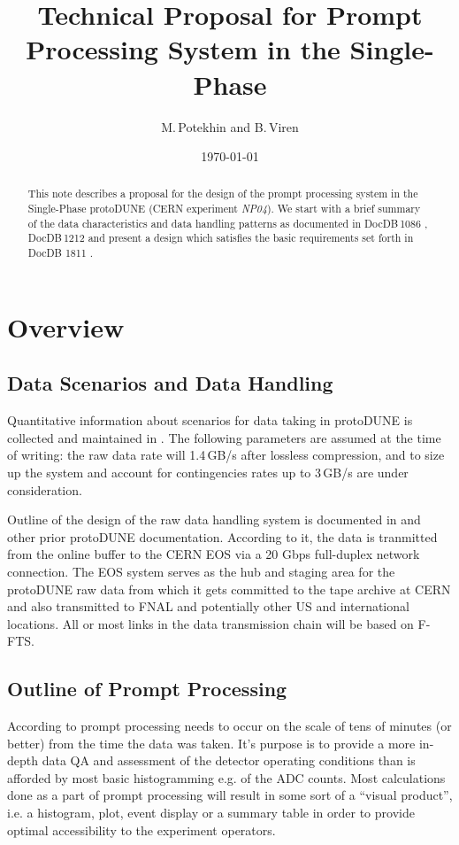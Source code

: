 \documentclass[pdftex,12pt,letter]{article}
\title{Technical Proposal for Prompt Processing System in the Single-Phase \pd}
\date{\today}
\author{M.\,Potekhin and B.\,Viren}
\newcommand{\pd}{protoDUNE\xspace}
\newcommand{\expname}{\textit{NP04}\xspace}
\begin{document}
\maketitle

\begin{abstract}
\noindent  This note describes a proposal for the design of
the prompt processing system in the Single-Phase \pd
(CERN experiment \expname). We start with a brief summary of the data characteristics and data handling patterns
as documented in DocDB\,1086 \cite{docdb1086}, DocDB\,1212 \cite{docdb1212} and present a design which
satisfies the basic requirements set forth in  DocDB 1811 \cite{docdb1811}.
\end{abstract}

\section{Overview}
\subsection{Data Scenarios and Data Handling}
\label{sec:rawdata}
Quantitative information about scenarios for data taking in \pd is collected and maintained in \cite{docdb1086}. The following parameters
are assumed at the time of writing: the raw data rate will 1.4\,GB/s after lossless compression, and to size up
the system and account for contingencies rates up to 3\,GB/s are under consideration.

Outline of the design of the raw data handling system is documented in  \cite{docdb1212} and other prior \pd documentation.
According to it, the data is tranmitted from the online buffer to the CERN EOS via a 20 Gbps full-duplex network connection.
The EOS system serves as the hub and staging area for the \pd raw data from which
it gets committed to the tape archive at CERN and also transmitted to FNAL and potentially
other US and international locations. All or most links in the data transmission chain will be based on F-FTS.

\subsection{Outline of Prompt Processing}
\label{sec:outline}
According to \cite{docdb1811}  prompt processing needs to occur on the scale
of tens of minutes (or better) from the time the data was taken. It's purpose is to
provide a more in-depth data QA and assessment of the detector operating conditions
than is afforded by most basic histogramming e.g. of the ADC counts. Most calculations
done as a part of prompt processing will result in some sort of a ``visual product'', i.e. a histogram,
plot, event display or a summary table in order to provide optimal accessibility to the experiment
operators.
\end{document}
